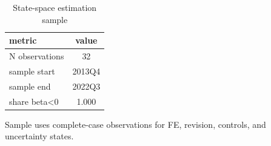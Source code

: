 \begin{table}[!htbp]
\centering
\caption{State-space estimation sample}
\label{tab:ssm_sample}
\begin{threeparttable}
\begin{tabular}{lc}
\toprule
metric & value \\
\midrule
N observations & 32 \\
sample start & 2013Q4 \\
sample end & 2022Q3 \\
share beta<0 & 1.000 \\
\bottomrule
\end{tabular}
\begin{tablenotes}[flushleft]
\footnotesize
\item Sample uses complete-case observations for FE, revision, controls, and uncertainty states.
\end{tablenotes}
\end{threeparttable}
\end{table}
